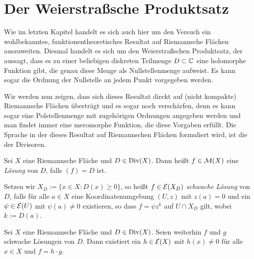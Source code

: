
\section{Der Weierstraßsche Produktsatz}
\label{sec:Weierstrass}

Wie im letzten Kapitel handelt es sich auch hier um den Versuch ein
wohlbekanntes, funktionentheoretisches Resultat auf Riemannsche
Flächen auszuweiten. Diesmal handelt es sich um den
Weierstraßschen Produktsatz, der aussagt, dass es zu einer beliebigen
diskreten Teilmenge $D \subset \mathbb{C}$ eine holomorphe Funktion gibt, die
genau diese Menge als Nullstellenmenge aufweist. Es kann sogar die
Ordnung der Nullstelle an jedem Punkt vorgegeben werden.

Wir werden nun zeigen, dass sich dieses Resultat direkt auf (nicht
kompakte) Riemannsche Flächen überträgt und es sogar noch verschärfen,
denn es kann sogar eine Polstellenmenge mit zugehörigen Ordnungen
angegeben werden und man findet immer eine meromorphe Funktion, die
diese Vorgaben erfüllt. Die Sprache in der dieses Resultat auf
Riemannschen Flächen formuliert wird, ist die der Divisoren.

\begin{defin}
  \label{def:divisor-lsg}
  Sei $X$ eine Riemannsche Fläche und $D \in \operatorname{Div}(X)$. Dann heißt $f
  \in \mathcal{M}(X)$ eine \emph{Lösung} von $D$, falls $(f) = D$ ist.
  
  Setzen wir $X_D := \{x \in X: D(x) \geq 0 \}$, so heißt $f \in
  \mathcal{E}(X_D)$ \emph{schwache Lösung} von $D$, falls für alle $a \in X$
  eine Koordinatenumgebung $(U,z)$ mit $z(a) = 0$ und ein $\psi \in
  \mathcal{E}(U)$ mit $\psi(a) \neq 0$ existieren, so dass $f = \psi z^k$
  auf $ U \cap X_D$ gilt, wobei $k := D(a)$.
\end{defin}

\begin{lemma}
  Sei $X$ eine Riemannsche Fläche und $D \in \operatorname{Div}(X)$. Seien weiterhin
  $f$ und $g$ schwache Lösungen von $D$. Dann existiert ein
  $h \in \mathcal{E}(X)$ mit $h(x) \neq 0$ für alle $x \in X$ und $ f
  = h\cdot g$.
\end{lemma}

